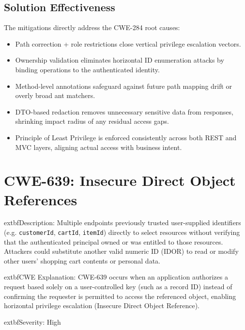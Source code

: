 \documentclass[]{UCD_CS_FYP_Report}
\begin{document}
\subsection*{Solution Effectiveness}
The mitigations directly address the CWE-284 root causes:
\begin{itemize}
	\item Path correction + role restrictions close vertical privilege escalation vectors.
	\item Ownership validation eliminates horizontal ID enumeration attacks by binding operations to the authenticated identity.
	\item Method-level annotations safeguard against future path mapping drift or overly broad ant matchers.
	\item DTO-based redaction removes unnecessary sensitive data from responses, shrinking impact radius of any residual access gaps.
	\item Principle of Least Privilege is enforced consistently across both REST and MVC layers, aligning actual access with business intent.
\end{itemize}



\section{CWE-639: Insecure Direct Object References }

	extbf{Description}: Multiple endpoints previously trusted user-supplied identifiers (e.g. \texttt{customerId}, \texttt{cartId}, \texttt{itemId}) directly to select resources without verifying that the authenticated principal owned or was entitled to those resources. Attackers could substitute another valid numeric ID (IDOR) to read or modify other users' shopping cart contents or personal data.

	extbf{CWE Explanation}: CWE-639 occurs when an application authorizes a request based solely on a user-controlled key (such as a record ID) instead of confirming the requester is permitted to access the referenced object, enabling horizontal privilege escalation (Insecure Direct Object Reference).

	extbf{Severity}: High
\end{document}
